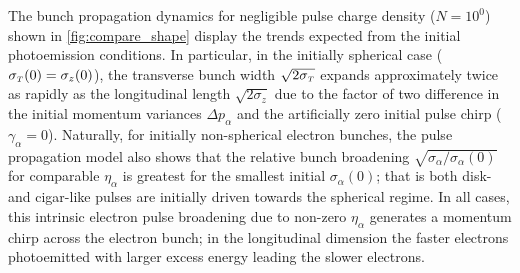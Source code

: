 The bunch propagation dynamics for negligible pulse charge density ($ N = 10^{0} $) shown in \ref{fig:compare_shape} display the trends expected from the initial photoemission conditions.
In particular, in the initially spherical case ($ \sigma_{{\scriptscriptstyle T}} (0) = \sigma_{z} (0) $), the transverse bunch width $ \sqrt{2 \sigma_{{\scriptscriptstyle T}}} $ expands approximately twice as rapidly as the longitudinal length $ \sqrt{2 \sigma_{z}} $ due to the factor of two difference in the initial momentum variances $ \Delta p_{\alpha} $ and the artificially zero initial pulse chirp ($ \gamma_{\alpha} = 0 $).
Naturally, for initially non-spherical electron bunches, the pulse propagation model also shows that the relative bunch broadening $ \sqrt{ \sigma_{\alpha} / \sigma_{\alpha} (0) } $ for comparable $ \eta_{\alpha} $ is greatest for the smallest initial $ \sigma_{\alpha} (0) $; that is both disk- and cigar-like pulses are initially driven towards the spherical regime.
In all cases, this intrinsic electron pulse broadening due to non-zero $ \eta_{\alpha} $ generates a momentum chirp across the electron bunch; in the longitudinal dimension the faster electrons photoemitted with larger excess energy leading the slower electrons.

